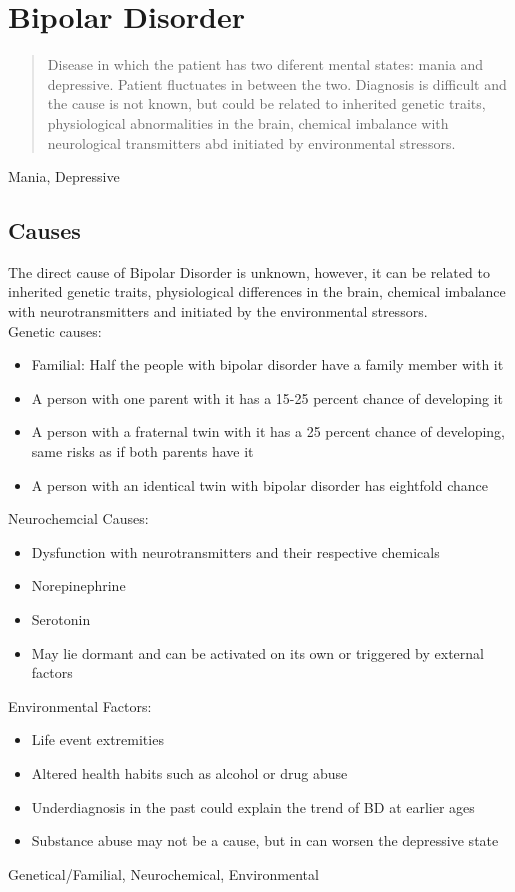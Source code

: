 \documentclass[journal]{IEEEtran}
\begin{document}
\section{Bipolar Disorder}
\begin{abstract}
Disease in which the patient has two diferent mental states: mania and depressive. Patient fluctuates in between the two. Diagnosis is difficult and the cause is not known, but could be related to inherited genetic traits, physiological abnormalities in the brain, chemical imbalance with neurological transmitters abd initiated by environmental stressors.
\end{abstract}
\begin{IEEEkeywords}
Mania, Depressive
\end{IEEEkeywords}
\subsection{Causes}
The direct cause of Bipolar Disorder is unknown, however, it can be related to inherited genetic traits, physiological differences in the brain, chemical imbalance with neurotransmitters and initiated by the environmental stressors.
\\
\vspace{2 mm}
Genetic causes:
\begin{itemize}
\item Familial: Half the people with bipolar disorder have a family member with it
\item A person with one parent with it has a 15-25 percent chance of developing it
\item A person with a fraternal twin with it has a 25 percent chance of developing, same risks as if both parents have it
\item A person with an identical twin with bipolar disorder has eightfold chance
\end{itemize}
\vspace{2 mm}
Neurochemcial Causes:
\begin{itemize}
\item Dysfunction with neurotransmitters and their respective chemicals
\item Norepinephrine
\item Serotonin
\item May lie dormant and can be activated on its own or triggered by external factors
\end{itemize}
Environmental Factors:
\begin{itemize}
\item Life event extremities
\item Altered health habits such as alcohol or drug abuse
\item Underdiagnosis in the past could explain the trend of BD at earlier ages
\item Substance abuse may not be a cause, but in can worsen the depressive state
\end{itemize}
\begin{IEEEkeywords}
Genetical/Familial, Neurochemical, Environmental
\end{IEEEkeywords}
\end{document}
